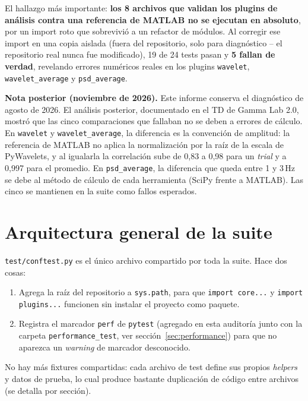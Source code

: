 \documentclass[11pt,a4paper]{article}
\begin{document}
El hallazgo más importante: \textbf{los 8 archivos que validan los plugins de análisis contra una referencia
de MATLAB no se ejecutan en absoluto}, por un import roto que sobrevivió a un refactor de módulos. Al
corregir ese import en una copia aislada (fuera del repositorio, solo para diagnóstico -- el repositorio real
nunca fue modificado), 19 de 24 tests pasan y \textbf{5 fallan de verdad}, revelando errores numéricos reales
en los plugins \texttt{wavelet}, \texttt{wavelet\_\allowbreak average} y \texttt{psd\_\allowbreak average}.

\noindent\textbf{Nota posterior (noviembre de 2026).} Este informe conserva el diagnóstico de agosto de 2026. El análisis posterior, documentado en el TD de Gamma Lab 2.0, mostró que las cinco comparaciones que fallaban no se deben a errores de cálculo. En \texttt{wavelet} y \texttt{wavelet\_\allowbreak average}, la diferencia es la convención de amplitud: la referencia de MATLAB no aplica la normalización por la raíz de la escala de PyWavelets, y al igualarla la correlación sube de 0,83 a 0,98 para un \textit{trial} y a 0,997 para el promedio. En \texttt{psd\_\allowbreak average}, la diferencia que queda entre 1 y 3\,Hz se debe al método de cálculo de cada herramienta (SciPy frente a MATLAB). Las cinco se mantienen en la suite como fallos esperados.

\section{Arquitectura general de la suite}

\texttt{test/conftest.py} es el único archivo compartido por toda la suite. Hace dos cosas:

\begin{enumerate}
  \item Agrega la raíz del repositorio a \texttt{sys.path}, para que \texttt{import core...} y
        \texttt{import plugins...} funcionen sin instalar el proyecto como paquete.
  \item Registra el marcador \texttt{perf} de \texttt{pytest} (agregado en esta auditoría junto con la
        carpeta \texttt{performance\_\allowbreak test}, ver sección~\ref{sec:performance}) para que no aparezca un
        \textit{warning} de marcador desconocido.
\end{enumerate}

No hay más fixtures compartidas: cada archivo de test define sus propios \textit{helpers} y datos de
prueba, lo cual produce bastante duplicación de código entre archivos (se detalla por sección).
\end{document}
